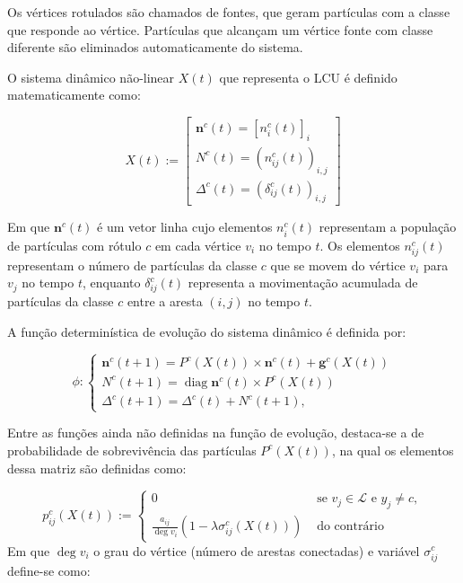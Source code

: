 Os vértices rotulados são chamados de fontes, que geram partículas com
a classe que responde ao vértice. Partículas que alcançam um vértice fonte
com classe diferente são eliminados automaticamente do sistema.

O sistema dinâmico não-linear $X(t)$ que representa o \gls{LCU} é definido
matematicamente como:

\begin{equation}\label{eq:lcu-x}
  X(t):=\left[\begin{array}{c}
    \mathbf{n}^c(t)={\left[n_i^c(t)\right]}_i \\
    N^c(t)={\left(n_{i j}^c(t)\right)}_{i, j} \\
    \Delta^c(t)={\left(\delta_{i j}^c(t)\right)}_{i, j}
\end{array}\right]
\end{equation}

\noindent
Em que $ \mathbf{n}^c(t)$ é um vetor linha cujo elementos $n_i^c(t)$
representam a população de partículas com rótulo $c$ em cada vértice
$v_i$ no tempo $t$. Os elementos $n_{i j}^c(t)$ representam o número
de partículas da classe $c$ que se movem do vértice $v_i$ para $v_j$ no
tempo $ t $, enquanto $\delta_{i j}^c(t)$ representa a movimentação
acumulada de partículas da classe $c$ entre a aresta $(i, j)$ no tempo
$t$.

A função determinística de evolução do sistema dinâmico é definida
por:

\begin{equation}\label{eq:lcu-phi-evolution}
  \phi:\left\{\begin{array}{l}
    \mathbf{n}^c(t+1)= P^c(X(t)) \times \mathbf{n}^c(t) +\mathbf{g}^c(X(t)) \\
    N^c(t+1)=\operatorname{diag} \mathbf{n}^c(t) \times P^c(X(t)) \\
    \Delta^c(t+1)=\Delta^c(t)+N^c(t+1),
  \end{array}\right.
\end{equation}

Entre as funções ainda não definidas na função de evolução, destaca-se a de
probabilidade de sobrevivência das partículas $P^c(X(t))$, na qual os
elementos dessa matriz são definidas como:

\begin{equation} \label{eq:lcu-probability}
  p_{i j}^c(X(t)):= \begin{cases}0 & \text { se } v_j \in \mathcal{L} \text { e
                                     } y_j \neq c, \\
    \frac{a_{i j}}{\deg v_i}\left(1-\lambda \sigma_{i
    j}^c(X(t))\right) & \text { do contrário }\end{cases}
\end{equation}
\noindent
Em que ${\deg v_i}$ o grau do vértice (número de arestas
conectadas) e variável $\sigma_{i j}^c$ define-se como:

